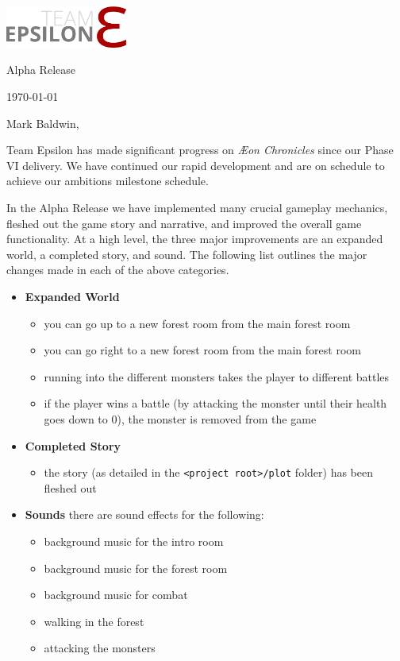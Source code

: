 \documentclass[12pt]{article}
\newcommand\aeon{\textit{\AE on Chronicles}\xspace}
\newcommand\releasename{Alpha Release\xspace}
\newcommand\te{Team Epsilon\xspace}
\begin{document}
\hfill\includegraphics[width=4cm]{../graphics/logo/team-epsilon-light-cropped}

\hfill \releasename

\hfill \today

Mark Baldwin,

\te has made significant progress on \aeon since our Phase VI delivery. We have
continued our rapid development and are on schedule to achieve our ambitions
milestone schedule.

In the \releasename we have implemented many crucial gameplay mechanics, fleshed
out the game story and narrative, and improved the overall game functionality.
At a high level, the three major improvements are an expanded world, a completed
story, and sound. The following list outlines the major changes made in each of
the above categories.

\begin{itemize}
    \item \textbf{Expanded World}
        \begin{itemize}[noitemsep]
            \item you can go up to a new forest room from the main forest room
            \item you can go right to a new forest room from the main forest
                room
            \item running into the different monsters takes the player to
                different battles
            \item if the player wins a battle (by attacking the monster until
                their health goes down to 0), the monster is removed from the
                game
        \end{itemize}

    \item \textbf{Completed Story}
        \begin{itemize}[noitemsep]
            \item the story (as detailed in the \texttt{<project root>/plot}
                folder) has been fleshed out
        \end{itemize}

    \item \textbf{Sounds} there are sound effects for the following:
        \begin{itemize}[noitemsep]
            \item background music for the intro room
            \item background music for the forest room
            \item background music for combat
            \item walking in the forest
            \item attacking the monsters
        \end{itemize}
\end{itemize}
\end{document}
